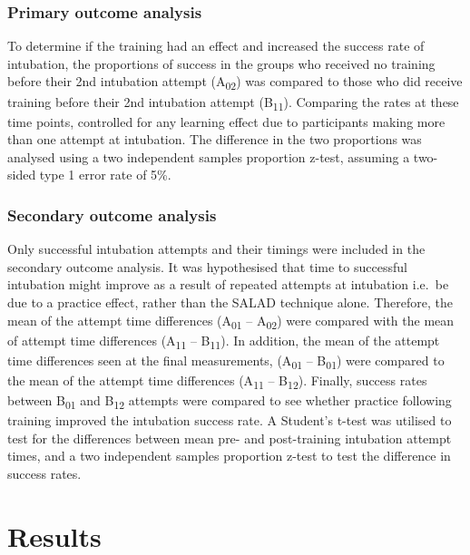 \documentclass[]{article}
\begin{document}
\hypertarget{primary-outcome-analysis}{%
\subsubsection{Primary outcome
analysis}\label{primary-outcome-analysis}}

To determine if the training had an effect and increased the success
rate of intubation, the proportions of success in the groups who
received no training before their 2nd intubation attempt
(A\textsubscript{02}) was compared to those who did receive training
before their 2nd intubation attempt (B\textsubscript{11}). Comparing the
rates at these time points, controlled for any learning effect due to
participants making more than one attempt at intubation. The difference
in the two proportions was analysed using a two independent samples
proportion z-test, assuming a two-sided type 1 error rate of 5\%.

\hypertarget{secondary-outcome-analysis}{%
\subsubsection{Secondary outcome
analysis}\label{secondary-outcome-analysis}}

Only successful intubation attempts and their timings were included in
the secondary outcome analysis. It was hypothesised that time to
successful intubation might improve as a result of repeated attempts at
intubation i.e.~be due to a practice effect, rather than the SALAD
technique alone. Therefore, the mean of the attempt time differences
(A\textsubscript{01} -- A\textsubscript{02}) were compared with the mean
of attempt time differences (A\textsubscript{11} --
B\textsubscript{11}). In addition, the mean of the attempt time
differences seen at the final measurements, (A\textsubscript{01} --
B\textsubscript{01}) were compared to the mean of the attempt time
differences (A\textsubscript{11} -- B\textsubscript{12}). Finally,
success rates between B\textsubscript{01} and B\textsubscript{12}
attempts were compared to see whether practice following training
improved the intubation success rate. A Student's t-test was utilised to
test for the differences between mean pre- and post-training intubation
attempt times, and a two independent samples proportion z-test to test
the difference in success rates.

\hypertarget{results-1}{%
\section{Results}\label{results-1}}
\end{document}
